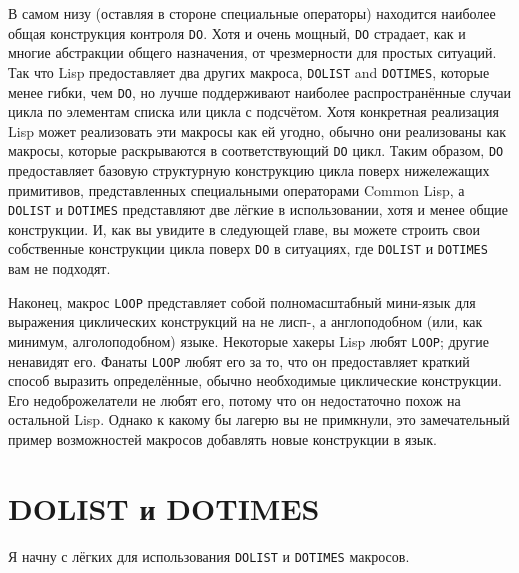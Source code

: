 В самом низу (оставляя в стороне специальные операторы) находится наиболее общая
конструкция контроля \lstinline{DO}. Хотя и очень мощный, \lstinline{DO} страдает, как и многие
абстракции общего назначения, от чрезмерности для простых ситуаций. Так что Lisp
предоставляет два других макроса, \lstinline{DOLIST} and \lstinline{DOTIMES}, которые менее гибки,
чем \lstinline{DO}, но лучше поддерживают наиболее распространённые случаи цикла по элементам
списка или цикла с подсчётом. Хотя конкретная реализация Lisp может реализовать эти
макросы как ей угодно, обычно они реализованы как макросы, которые раскрываются в
соответствующий \lstinline{DO} цикл. Таким образом, \lstinline{DO} предоставляет базовую структурную
конструкцию цикла поверх нижележащих примитивов, представленных специальными операторами
Common Lisp, а \lstinline{DOLIST} и \lstinline{DOTIMES} представляют две лёгкие в использовании,
хотя и менее общие конструкции. И, как вы увидите в следующей главе, вы можете строить
свои собственные конструкции цикла поверх \lstinline{DO} в ситуациях, где \lstinline{DOLIST} и
\lstinline{DOTIMES} вам не подходят.

Наконец, макрос \lstinline{LOOP} представляет собой полномасштабный мини-язык для выражения
циклических конструкций на не лисп-, а англоподобном (или, как минимум, алголоподобном)
языке. Некоторые хакеры Lisp любят \lstinline{LOOP}; другие ненавидят его. Фанаты \lstinline{LOOP}
любят его за то, что он предоставляет краткий способ выразить определённые, обычно
необходимые циклические конструкции. Его недоброжелатели не любят его, потому что он
недостаточно похож на остальной Lisp. Однако к какому бы лагерю вы не примкнули, это
замечательный пример возможностей макросов добавлять новые конструкции в язык.

\section{DOLIST и DOTIMES}

Я начну с лёгких для использования \lstinline{DOLIST} и \lstinline{DOTIMES} макросов.

